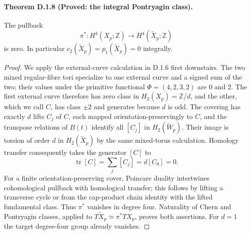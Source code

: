\paragraph{Theorem D.1.8 (Proved: the integral Pontryagin class).}
The pullback
\[
 \pi^*:H^4(X_p;\mathbb Z)\longrightarrow
 H^4(\widetilde X_p;\mathbb Z)
\]
is zero. In particular
$c_2(\widetilde X_p)=p_1(\widetilde X_p)=0$ integrally.
\begin{proof}
We apply the external-curve calculation in D.1.6 first downstairs.
The two mixed regular-fibre tori specialize to one external curve
and a signed sum of the two; their values under the primitive
functional $\Phi=(4,2,3,2)$ are $0$ and $2$.
The first external curve therefore has zero class in
$H_2(X_p)=\mathbb Z/d$, and the other, which we call $C$, has
class $\pm2$ and generates because $d$ is odd.
The covering has exactly $d$ lifts $C_j$ of $C$, each mapped
orientation-preservingly to $C$, and the transpose relations of
$B(t)$ identify all $[C_j]$ in $H_2(\widetilde W_p)$.
Their image is torsion of order $d$ in $H_2(\widetilde X_p)$
by the same mixed-torus calculation. Homology transfer consequently
takes the generator $[C]$ to
\[
 \operatorname{tr}[C]=\sum_j[C_j]=d[C_0]=0.
\]
For a finite orientation-preserving cover, Poincare duality
intertwines cohomological pullback with homological transfer;
this follows by lifting a transverse cycle or from the cap-product
chain identity with the lifted fundamental class. Thus $\pi^*$
vanishes in degree four. Naturality of Chern and Pontryagin
classes, applied to $T\widetilde X_p\simeq\pi^*TX_p$, proves
both assertions. For $d=1$ the target degree-four group already
vanishes.
\end{proof}

